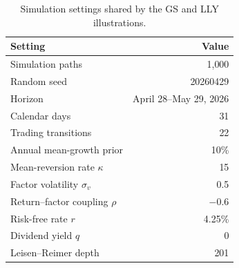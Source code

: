\begin{table}[H]
\centering
\caption{Simulation settings shared by the GS and LLY illustrations.}\label{tab:scenario_settings}
\begin{tabular}{lr}
\toprule
Setting & Value \\
\midrule
Simulation paths & 1{,}000 \\
Random seed & 20260429 \\
Horizon & April 28--May 29, 2026 \\
Calendar days & 31 \\
Trading transitions & 22 \\
Annual mean-growth prior & 10\% \\
Mean-reversion rate $\kappa$ & 15 \\
Factor volatility $\sigma_v$ & 0.5 \\
Return--factor coupling $\rho$ & $-0.6$ \\
Risk-free rate $r$ & 4.25\% \\
Dividend yield $q$ & 0 \\
Leisen--Reimer depth & 201 \\
\bottomrule
\end{tabular}
\end{table}

\begin{table}[H]
\centering
\caption{Entry prices and short-position outcomes for the GS put and call over 1{,}000 simulated paths from April 28 to May 29, 2026. The horizon had 31 calendar days and 22 trading-day steps. Option values and P\&L are in dollars per share.}
\label{tab:gs_scenario}

\end{table}

